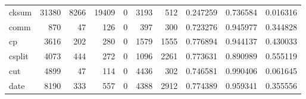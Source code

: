 \begin{longtable}{lrrrrrrrrr}
cksum     &                                              31380 &                                               8266 &                                              19409 &                                                  0 &                                               3193 &                                                512 &                                           0.247259 &                               0.736584 &                             0.016316 \\
comm      &                                                870 &                                                 47 &                                                126 &                                                  0 &                                                397 &                                                300 &                                           0.723276 &                               0.945977 &                             0.344828 \\
cp        &                                               3616 &                                                202 &                                                280 &                                                  0 &                                               1579 &                                               1555 &                                           0.776894 &                               0.944137 &                             0.430033 \\
csplit    &                                               4073 &                                                444 &                                                272 &                                                  0 &                                               1096 &                                               2261 &                                           0.773631 &                               0.890989 &                             0.555119 \\
cut       &                                               4899 &                                                 47 &                                                114 &                                                  0 &                                               4436 &                                                302 &                                           0.746581 &                               0.990406 &                             0.061645 \\
date      &                                               8190 &                                                333 &                                                557 &                                                  0 &                                               4388 &                                               2912 &                                           0.774389 &                               0.959341 &                             0.355556 \\

\end{longtable}
